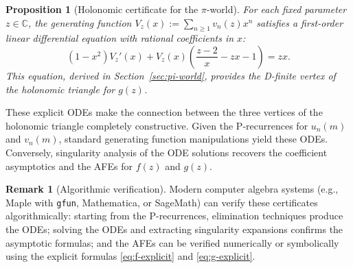 \documentclass[11pt,reqno]{amsart}
\newtheorem{proposition}[theorem]{Proposition}
\theoremstyle{definition}
\newtheorem{remark}[theorem]{Remark}
\newcommand{\C}{\mathbb{C}}
\numberwithin{equation}{section}
\begin{document}
\begin{proposition}[Holonomic certificate for the $\pi$-world]\label{prop:GF-ODE-pi}
For each fixed parameter $z\in\C$, the generating function $V_z(x) := \sum_{n\ge1}v_n(z)x^n$ satisfies a first-order linear differential equation with rational coefficients in $x$:
\[
  (1-x^2)V_z'(x) + V_z(x)\left(\frac{z-2}{x}-zx-1\right) = zx.
\]
This equation, derived in Section~\ref{sec:pi-world}, provides the D-finite vertex of the holonomic triangle for $g(z)$.
\end{proposition}

These explicit ODEs make the connection between the three vertices of the holonomic triangle completely constructive. Given the P-recurrences for $u_n(m)$ and $v_n(m)$, standard generating function manipulations yield these ODEs. Conversely, singularity analysis of the ODE solutions recovers the coefficient asymptotics and the AFEs for $f(z)$ and $g(z)$.

\begin{remark}[Algorithmic verification]
Modern computer algebra systems (e.g., Maple with \texttt{gfun}, Mathematica, or SageMath) can verify these certificates algorithmically: starting from the P-recurrences, elimination techniques produce the ODEs; solving the ODEs and extracting singularity expansions confirms the asymptotic formulas; and the AFEs can be verified numerically or symbolically using the explicit formulas \eqref{eq:f-explicit} and \eqref{eq:g-explicit}.
\end{remark}
\end{document}
